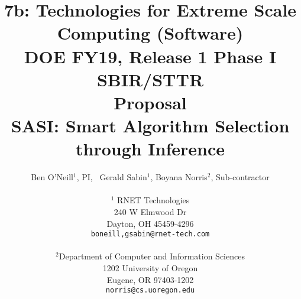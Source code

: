 \title{7b: Technologies for Extreme Scale Computing (Software)\\
DOE FY19, Release 1 Phase I SBIR/STTR \\
\vspace{0.25in}Proposal\\
\vspace{0.25in} SASI: Smart Algorithm Selection through Inference \\
\vspace{0.5in}}
\author{Ben O'Neill$^1$, PI, \ Gerald Sabin$^1$, Boyana Norris$^2$, Sub-contractor\\
  \\$^1$ RNET Technologies\\
  240 W Elmwood Dr\\
  Dayton, OH 45459-4296\\
{\tt {boneill,gsabin}@rnet-tech.com}\\\\
$^2$Department of Computer and Information Sciences\\
  1202 University of Oregon\\
  Eugene, OR 97403-1202\\
  {\tt norris@cs.uoregon.edu}
}